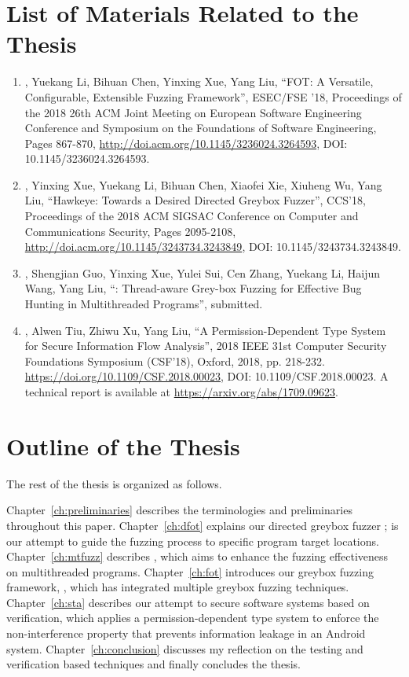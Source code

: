 \section{List of Materials Related to the Thesis}
\begin{enumerate}
	\item \myname, Yuekang Li, Bihuan Chen, Yinxing Xue, Yang Liu, ``FOT: A Versatile, Configurable, Extensible Fuzzing Framework'', ESEC/FSE '18, Proceedings of the 2018 26th ACM Joint Meeting on European Software Engineering Conference and Symposium on the Foundations of Software Engineering, Pages 867-870, \url{http://doi.acm.org/10.1145/3236024.3264593}, DOI: 10.1145/3236024.3264593.
	\item \myname, Yinxing Xue, Yuekang Li, Bihuan Chen, Xiaofei Xie, Xiuheng Wu, Yang Liu, ``Hawkeye: Towards a Desired Directed Greybox Fuzzer'', CCS'18, Proceedings of the 2018 ACM SIGSAC Conference on Computer and Communications Security, Pages 2095-2108, \url{http://doi.acm.org/10.1145/3243734.3243849}, DOI: 10.1145/3243734.3243849.
	\item \myname, Shengjian Guo, Yinxing Xue, Yulei Sui, Cen Zhang, Yuekang Li, Haijun Wang, Yang Liu, ``\mtfuzz: Thread-aware Grey-box Fuzzing for Effective Bug Hunting in Multithreaded Programs'', submitted.
	\item \myname, Alwen Tiu, Zhiwu Xu, Yang Liu, ``A Permission-Dependent Type System for Secure Information Flow Analysis'', 2018 IEEE 31st Computer Security Foundations Symposium (CSF'18), Oxford, 2018, pp. 218-232. \url{https://doi.org/10.1109/CSF.2018.00023}, DOI: 10.1109/CSF.2018.00023. A technical report is available at \url{https://arxiv.org/abs/1709.09623}.
\end{enumerate}

\section{Outline of the Thesis}

The rest of the thesis is organized as follows.

Chapter~\ref{ch:preliminaries} describes the terminologies and preliminaries throughout this paper. Chapter~\ref{ch:dfot} explains our directed greybox fuzzer \dFOT; \dFOT is our attempt to guide the fuzzing process to specific program target locations. Chapter~\ref{ch:mtfuzz} describes \mtfuzz, which aims to enhance the fuzzing effectiveness on multithreaded programs. Chapter~\ref{ch:fot} introduces our greybox fuzzing framework, \FOT, which has integrated multiple greybox fuzzing techniques.  Chapter~\ref{ch:sta} describes our attempt to secure software systems based on verification, which applies a permission-dependent type system to enforce the non-interference property that prevents information leakage in an Android system. Chapter~\ref{ch:conclusion} discusses my reflection on the testing and verification based techniques and finally concludes the thesis.